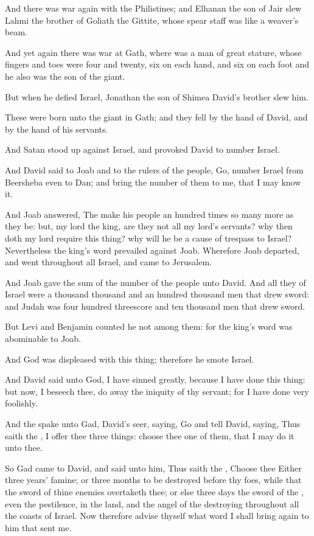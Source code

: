 \Verse And there was war again with the Philistines; and Elhanan the son of Jair slew Lahmi the brother of Goliath the Gittite, whose spear staff was like a weaver's beam.

\Verse And yet again there was war at Gath, where was a man of great stature, whose fingers and toes were four and twenty, six on each hand, and six on each foot and he also was the son of the giant.

\Verse But when he defied Israel, Jonathan the son of Shimea David's brother slew him.

\Verse These were born unto the giant in Gath; and they fell by the hand of David, and by the hand of his servants.


\Chapter
\Verse And Satan stood up against Israel, and provoked David to number Israel.

\Verse And David said to Joab and to the rulers of the people, Go, number Israel from Beersheba even to Dan; and bring the number of them to me, that I may know it.

\Verse And Joab answered, The \LORD make his people an hundred times so many more as they be: but, my lord the king, are they not all my lord's servants?  why then doth my lord require this thing? why will he be a cause of trespass to Israel?  \Verse Nevertheless the king's word prevailed against Joab. Wherefore Joab departed, and went throughout all Israel, and came to Jerusalem.

\Verse And Joab gave the sum of the number of the people unto David. And all they of Israel were a thousand thousand and an hundred thousand men that drew sword: and Judah was four hundred threescore and ten thousand men that drew sword.

\Verse But Levi and Benjamin counted he not among them: for the king's word was abominable to Joab.

\Verse And God was displeased with this thing; therefore he smote Israel.

\Verse And David said unto God, I have sinned greatly, because I have done this thing: but now, I beseech thee, do away the iniquity of thy servant; for I have done very foolishly.

\Verse And the \LORD spake unto Gad, David's seer, saying, \Verse Go and tell David, saying, Thus saith the \LORD, I offer thee three things: choose thee one of them, that I may do it unto thee.

\Verse So Gad came to David, and said unto him, Thus saith the \LORD, Choose thee \Verse Either three years' famine; or three months to be destroyed before thy foes, while that the sword of thine enemies overtaketh thee; or else three days the sword of the \LORD, even the pestilence, in the land, and the angel of the \LORD destroying throughout all the coasts of Israel. Now therefore advise thyself what word I shall bring again to him that sent me.

